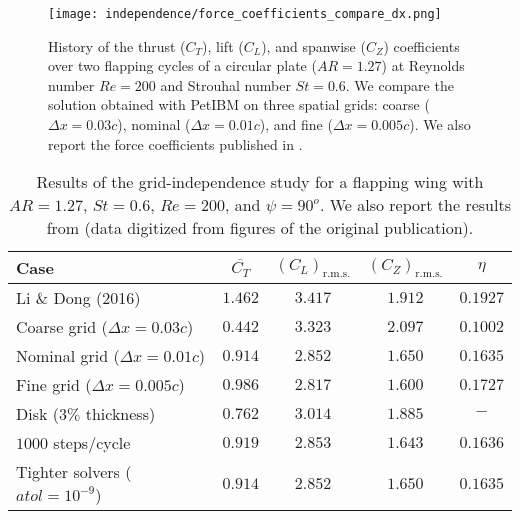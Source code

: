 \begin{figure}[!h]
  \centering
  \texttt{[image: independence/force\_coefficients\_compare\_dx.png]}
  \caption{History of the thrust ($C_T$), lift ($C_L$), and spanwise ($C_Z$) coefficients over two flapping cycles of a circular plate ($AR = 1.27$) at Reynolds number $Re = 200$ and Strouhal number $St = 0.6$. We compare the solution obtained with PetIBM on three spatial grids: coarse ($\Delta x = 0.03c$), nominal ($\Delta x = 0.01c$), and fine ($\Delta x = 0.005c$). We also report the force coefficients published in \citet{li_dong_2016}.}
  \label{fig:independence_force_coefficients_dx}
\end{figure}

\begin{table}[!h]
  \centering
  \begin{tabular}{lcccc}
    \hline\hline
    Case & $\overline{C_T}$ & $\left( C_L \right)_\text{r.m.s.}$ & $\left( C_Z \right)_\text{r.m.s.}$ & $\eta$ \\
    \hline
    Li \& Dong (2016) & $1.462$ & $3.417$ & $1.912$ & $0.1927$ \\
    Coarse grid ($\Delta x = 0.03c$) & $0.442$ & $3.323$ & $2.097$ & $0.1002$ \\
    Nominal grid ($\Delta x = 0.01c$) & $0.914$ & $2.852$ & $1.650$ & $0.1635$ \\
    Fine grid ($\Delta x = 0.005c$) & $0.986$ & $2.817$ & $1.600$ & $0.1727$ \\
    Disk ($3\%$ thickness) & $0.762$ & $3.014$ & $1.885$ & $-$ \\
    $1000$ steps/cycle & $0.919$ & $2.853$ & $1.643$ & $0.1636$ \\
    Tighter solvers ($atol = 10^{-9}$) & $0.914$ & $2.852$ & $1.650$ & $0.1635$ \\
    \hline\hline
  \end{tabular}
  \caption{Results of the grid-independence study for a flapping wing with $AR = 1.27$, $St = 0.6$, $Re = 200$, and $\psi = 90^o$. We also report the results from \citet{li_dong_2016} (data digitized from figures of the original publication).}
  \label{tab:independence_results}
\end{table}

